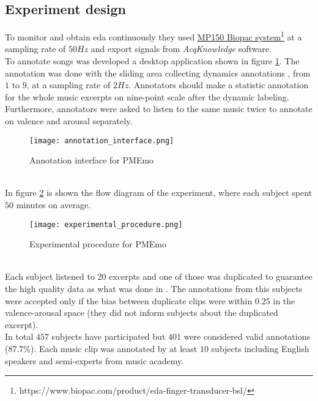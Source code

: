 \subsection{Experiment design}
To monitor and obtain \gls{eda} continuously they used \href{https://www.biopac.com/product/eda-finger-transducer-bsl/}{MP150 Biopac system}\footnote{https://www.biopac.com/product/eda-finger-transducer-bsl/} at a sampling rate of $50Hz$ and export signals from \textit{AcqKnowledge} software.
\\
To annotate songs was developed a desktop application shown in figure \ref{fig:annotation_interface}. The annotation was done with the sliding area collecting dynamics annotations , from $1$ to $9$, at a sampling rate of $2Hz$. Annotators should make a statistic annotation for the whole music excerpts on nine-point scale after the dynamic labeling. Furthermore, annotators were asked to listen to the same music twice to annotate on valence and arousal separately.
\begin{figure}[h]
    \centering
    \texttt{[image: annotation\_interface.png]} 
	\caption{Annotation interface for PMEmo}
    \label{fig:annotation_interface}
\end{figure}
\\
In figure \ref{fig:experimental_procedure} is shown the flow diagram of the experiment, where each subject spent $50$ minutes on average.
\begin{figure}[h]
    \centering
    \texttt{[image: experimental\_procedure.png]} 
	\caption{Experimental procedure for PMEmo}
    \label{fig:experimental_procedure}
\end{figure}
\\
Each subject listened to 20 excerpts and one of those was duplicated to guarantee the high quality data as what was done in \cite{chen2015amg1608}. The annotations from this subjects were accepted only if the bias between duplicate clips were within $0.25$ in the valence-arousal space (they did not inform subjects about the duplicated excerpt).
\\
In total $457$ subjects have participated but $401$ were considered valid annotations ($87.7\%$). Each music clip was annotated by at least $10$ subjects including English speakers and semi-experts from music academy.

